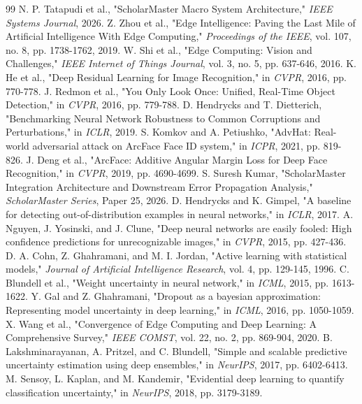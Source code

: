 \documentclass[conference]{IEEEtran}
\begin{document}
\begin{thebibliography}{99}
 N. P. Tatapudi et al., "ScholarMaster Macro System Architecture," \textit{IEEE Systems Journal}, 2026.
 Z. Zhou et al., "Edge Intelligence: Paving the Last Mile of Artificial Intelligence With Edge Computing," \textit{Proceedings of the IEEE}, vol. 107, no. 8, pp. 1738-1762, 2019.
 W. Shi et al., "Edge Computing: Vision and Challenges," \textit{IEEE Internet of Things Journal}, vol. 3, no. 5, pp. 637-646, 2016.
 K. He et al., "Deep Residual Learning for Image Recognition," in \textit{CVPR}, 2016, pp. 770-778.
 J. Redmon et al., "You Only Look Once: Unified, Real-Time Object Detection," in \textit{CVPR}, 2016, pp. 779-788.
 D. Hendrycks and T. Dietterich, "Benchmarking Neural Network Robustness to Common Corruptions and Perturbations," in \textit{ICLR}, 2019.
 S. Komkov and A. Petiushko, "AdvHat: Real-world adversarial attack on ArcFace Face ID system," in \textit{ICPR}, 2021, pp. 819-826.
 J. Deng et al., "ArcFace: Additive Angular Margin Loss for Deep Face Recognition," in \textit{CVPR}, 2019, pp. 4690-4699.
 S. Suresh Kumar, "ScholarMaster Integration Architecture and Downstream Error Propagation Analysis," \textit{ScholarMaster Series}, Paper 25, 2026.
 D. Hendrycks and K. Gimpel, "A baseline for detecting out-of-distribution examples in neural networks," in \textit{ICLR}, 2017.
 A. Nguyen, J. Yosinski, and J. Clune, "Deep neural networks are easily fooled: High confidence predictions for unrecognizable images," in \textit{CVPR}, 2015, pp. 427-436.
 D. A. Cohn, Z. Ghahramani, and M. I. Jordan, "Active learning with statistical models," \textit{Journal of Artificial Intelligence Research}, vol. 4, pp. 129-145, 1996.
 C. Blundell et al., "Weight uncertainty in neural network," in \textit{ICML}, 2015, pp. 1613-1622.
 Y. Gal and Z. Ghahramani, "Dropout as a bayesian approximation: Representing model uncertainty in deep learning," in \textit{ICML}, 2016, pp. 1050-1059.
 X. Wang et al., "Convergence of Edge Computing and Deep Learning: A Comprehensive Survey," \textit{IEEE COMST}, vol. 22, no. 2, pp. 869-904, 2020.
 B. Lakshminarayanan, A. Pritzel, and C. Blundell, "Simple and scalable predictive uncertainty estimation using deep ensembles," in \textit{NeurIPS}, 2017, pp. 6402-6413.
 M. Sensoy, L. Kaplan, and M. Kandemir, "Evidential deep learning to quantify classification uncertainty," in \textit{NeurIPS}, 2018, pp. 3179-3189.

\end{thebibliography}
\end{document}
